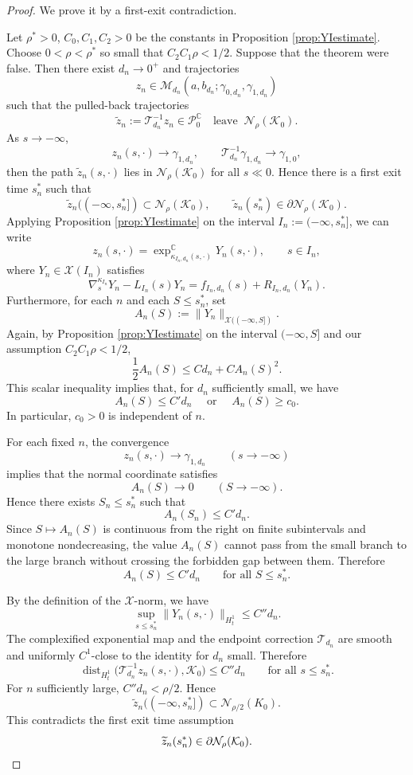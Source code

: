\documentclass[11pt]{amsart}
\theoremstyle{plain}
\theoremstyle{definition}
\newcommand{\C}{\mathbb{C}}
\newcommand{\PP}{\mathcal{P}}
\begin{document}
\begin{proof}
We prove it by a first-exit contradiction.

Let $\rho^*>0$, $C_0,C_1,C_2>0$ be the constants in Proposition \ref{prop:YIestimate}.
Choose $0<\rho<\rho^*$ so small that $C_2C_1\rho<1/2$. Suppose that the theorem were false. Then there exist $d_n\to0^+$ and
trajectories
\[z_n\in \mathcal{M}_{d_n}(a,b_{d_n};\gamma_{0,d_n},\gamma_{1,d_n})\]
such that the pulled-back trajectories
\[\widetilde z_n:=\mathcal T_{d_n}^{-1}z_n\in \PP^{\C}_0 \quad\text{leave }~\mathcal N_\rho(\mathcal{K}_0).\]
As $s\to-\infty$, 
\[z_n(s,\cdot)\to\gamma_{1,d_n},\qquad
\mathcal{T}_{d_n}^{-1}\gamma_{1,d_n}\to\gamma_{1,0}
,\]
then the path $\widetilde z_n(s,\cdot)$ lies in $\mathcal N_\rho(\mathcal{K}_0)$ for
all $s\ll0$. Hence there is a first exit time $s_n^*$
such that
\[
\widetilde z_n((-\infty,s_n^*])\subset\mathcal N_\rho(\mathcal{K}_0),\qquad
\widetilde z_n(s_n^*)\in\partial\mathcal N_\rho(\mathcal{K}_0).
\]
Applying Proposition \ref{prop:YIestimate} on the interval
$ I_n:=(-\infty,s_n^*]$, we can write
\[
z_n(s,\cdot)=\exp_{\kappa_{I_n,d_n}(s,\cdot)}^{\C}
Y_n(s,\cdot),\qquad s\in I_n,
\]
where $Y_n\in\mathcal X(I_n)$ satisfies
\[
\nabla_s^{\kappa_{I_n}}Y_n-L_{I_n}(s)Y_n=
f_{I_n,d_n}(s)+R_{I_n,d_n}(Y_n).
\]
Furthermore, for each $n$ and each $S\le s_n^*$, set
\[
A_n(S):=\|Y_n\|_{\mathcal X((-\infty,S])}.
\]
Again, by Proposition \ref{prop:YIestimate} on the interval $(-\infty,S]$ and our assumption $C_2C_1\rho<1/2$,
\[
\frac12 A_n(S)\le Cd_n+C A_n(S)^2 .
\]
This scalar inequality implies that, for $d_n$ sufficiently small, we have
\[
A_n(S)\le C'd_n\quad\text{ or }\quad A_n(S)\ge c_0.
\]
In particular, $c_0>0$ is independent of $n$.

For each fixed $n$, the convergence
\[
z_n(s,\cdot)\to\gamma_{1,d_n}\qquad (s\to-\infty)
\]
implies that %
the normal coordinate satisfies
\[
A_n(S)\to0 \qquad (S\to-\infty).
\]
Hence there exists $S_n\le s_n^*$ such that
\[
A_n(S_n)\le C'd_n.
\]
Since $S\mapsto A_n(S)$ is continuous from the right on finite subintervals
and monotone nondecreasing, the value $A_n(S)$ cannot pass from the small
branch to the large branch without crossing the forbidden gap between them.
Therefore
\[
A_n(S)\le C'd_n \qquad\text{for all }S\le s_n^*.
\]


By the definition of the $\mathcal X$-norm, we have
\[
\sup_{s\le s_n^*}\|Y_n(s,\cdot)\|_{H_t^1}
\le C''d_n.
\]
The complexified exponential map and the endpoint correction $\mathcal T_{d_n}$
are smooth and uniformly $C^1$-close to the identity for $d_n$ small.
Therefore
\[
\operatorname{dist}_{H_t^1}
\bigl(\mathcal T_{d_n}^{-1}z_n(s,\cdot),\mathcal{K}_0\bigr)
\le C''d_n\qquad\text{for all }s\le s_n^*.
\]
For $n$ sufficiently large, $C''d_n<\rho/2$. Hence
\[
\widetilde z_n((-\infty,s_n^*])
\subset\mathcal N_{\rho/2}(K_0).
\]
This contradicts the first exit time assumption
\[
\widetilde z_n(s_n^*)\in\partial\mathcal N_\rho(\mathcal{K}_0).\qedhere
\]
\end{proof}
\end{document}
